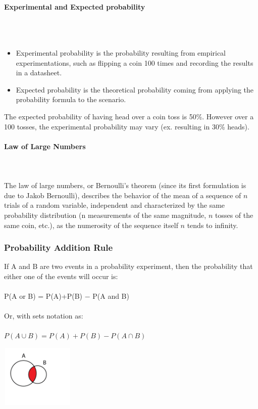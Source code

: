 \documentclass{article}
\begin{document}
\paragraph{Experimental and Expected probability}\mbox{} \\
\mbox{} \\
\begin{itemize}
    \item Experimental probability is the probability resulting from empirical experimentations, such as flipping a coin 100 times and recording the results in a datasheet.
    \item Expected probability is the theoretical probability coming from applying the probability formula to the scenario.
\end{itemize}

The expected probability of having head over a coin toss is 50\%. However over a 100 tosses, the experimental probability may vary (ex. resulting in 30\% heads).

\paragraph{Law of Large Numbers}\mbox{} \\
\mbox{} \\
The law of large numbers, or Bernoulli's theorem (since its first formulation is due to Jakob Bernoulli), describes the behavior of the mean of a sequence of $n$ trials of a random variable, independent and characterized by the same probability distribution (n measurements of the same magnitude, $n$ tosses of the same coin, etc.), as the numerosity of the sequence itself $n$ tends to infinity.

\subsubsection{Probability Addition Rule}
If A and B are two events in a probability experiment, then the probability that either one of the events will occur is: \\ 
\mbox{} \\
P(A or B) = P(A)+P(B) − P(A and B) \\ 
\mbox{} \\
Or, with sets notation as: \\ 
\mbox{} \\
$P(A \cup B) = P(A)+P(B)−P(A \cap B)$ 

\includegraphics[width=3.5cm, height=3cm]{intersection}
\end{document}
